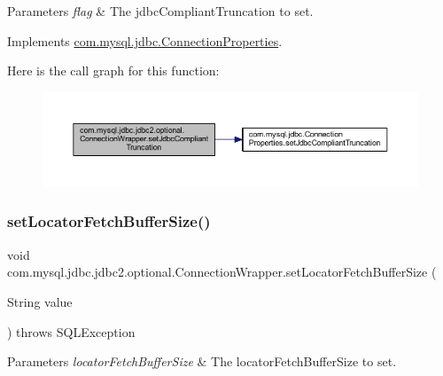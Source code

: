 \begin{DoxyParams}{Parameters}
{\em flag} & The jdbc\+Compliant\+Truncation to set. \\
\hline
\end{DoxyParams}


Implements \mbox{\hyperlink{interfacecom_1_1mysql_1_1jdbc_1_1_connection_properties_aa770c64e002c6ab1cb335107d0380476}{com.\+mysql.\+jdbc.\+Connection\+Properties}}.

Here is the call graph for this function\+:
\nopagebreak
\begin{figure}[H]
\begin{center}
\leavevmode
\includegraphics[width=350pt]{classcom_1_1mysql_1_1jdbc_1_1jdbc2_1_1optional_1_1_connection_wrapper_ac6acbc9e9f58e73211256f68e7f36a9a_cgraph}
\end{center}
\end{figure}
\mbox{\label{classcom_1_1mysql_1_1jdbc_1_1jdbc2_1_1optional_1_1_connection_wrapper_a81b230b8f38e3faa698214cb79cb03b6}} 
\subsubsection{\texorpdfstring{set\+Locator\+Fetch\+Buffer\+Size()}{setLocatorFetchBufferSize()}}
{\footnotesize\ttfamily void com.\+mysql.\+jdbc.\+jdbc2.\+optional.\+Connection\+Wrapper.\+set\+Locator\+Fetch\+Buffer\+Size (\begin{DoxyParamCaption}\item[{String}]{value }\end{DoxyParamCaption}) throws S\+Q\+L\+Exception}


\begin{DoxyParams}{Parameters}
{\em locator\+Fetch\+Buffer\+Size} & The locator\+Fetch\+Buffer\+Size to set. \\
\hline
\end{DoxyParams}


